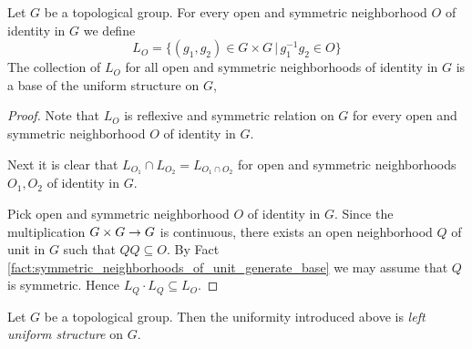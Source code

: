 \documentclass[10pt]{amsart}
\begin{document}
\begin{fact}\label{fact:left_uniform_structure_on_topological_group}
	Let $G$ be a topological group. For every open and symmetric neighborhood $O$ of identity in $G$ we define
	$$L_O = \big\{(g_1,g_2)\in G\times G\,\big|\,g_1^{-1}g_2 \in O\big\}$$
	The collection of $L_O$ for all open and symmetric neighborhoods of identity in $G$ is a base of the uniform structure on $G$,
\end{fact}
\begin{proof}
	Note that $L_O$ is reflexive and symmetric relation on $G$ for every open and symmetric neighborhood $O$ of identity in $G$.

	Next it is clear that $L_{O_1}\cap L_{O_2} = L_{O_1\cap O_2}$ for open and symmetric neighborhoods $O_1,O_2$ of identity in $G$.

	Pick open and symmetric neighborhood $O$ of identity in $G$. Since the multiplication $G\times G\rightarrow G$ is continuous, there exists an open neighborhood $Q$ of unit in $G$ such that $QQ \subseteq O$. By Fact \ref{fact:symmetric_neighborhoods_of_unit_generate_base} we may assume that $Q$ is symmetric. Hence $L_Q\cdot L_Q \subseteq L_O$.
\end{proof}

\begin{definition}
	Let $G$ be a topological group. Then the uniformity introduced above is \textit{left uniform structure} on $G$.
\end{definition}
\end{document}
